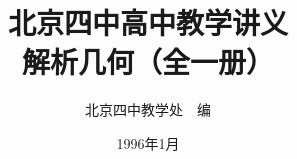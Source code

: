 \documentclass[b5paper, openany]{ctexbook}
\theoremstyle{plain}
\begin{document}
\title{\Huge\bfseries 北京四中高中教学讲义\\解析几何（全一册）}



\author{\Large 北京四中教学处~~编}
\date{\Large 1996年1月}

\maketitle




\frontmatter


\tableofcontents


\mainmatter

 


 


 
 

 

 
\backmatter


% 
\end{document}

